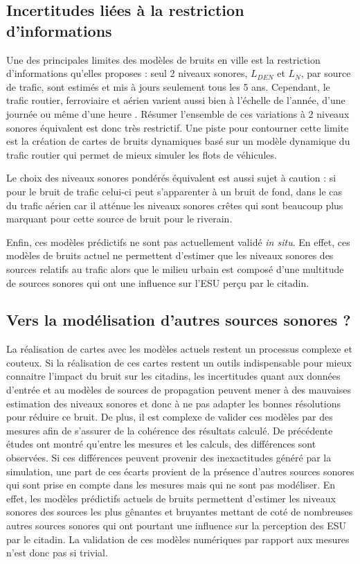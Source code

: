 \subsection{Incertitudes liées à la restriction d'informations}

Une des principales limites des modèles de bruits en ville est la restriction d'informations qu'elles proposes : seul 2 niveaux sonores, $L_{DEN}$ et $L_N$, par source de trafic, sont estimés et mis à jours seulement tous les 5 ans. Cependant, le trafic routier, ferroviaire et aérien varient aussi bien à l'échelle de l'année, d'une journée ou même d'une heure \cite{lv2015traffic}. Résumer l'ensemble de ces variations à 2 niveaux sonores équivalent est donc très restrictif. 
Une piste pour contourner cette limite est la création de cartes de bruits dynamiques basé sur un modèle dynamique du trafic routier qui permet de mieux simuler les flots de véhicules. 

Le choix des niveaux sonores pondérés équivalent est aussi sujet à caution : si pour le bruit de trafic celui-ci peut s'apparenter à un bruit de fond, dans le cas du trafic aérien  car il atténue les niveaux sonores crêtes qui sont beaucoup plus marquant pour cette source de bruit pour le riverain.

Enfin, ces modèles prédictifs ne sont pas actuellement validé \textit{in situ}. 
En effet, ces modèles de bruits actuel ne permettent d'estimer que les niveaux sonores des sources relatifs au trafic alors que le milieu urbain est composé d'une multitude de sources sonores qui ont une influence sur l'ESU perçu par le citadin.\\ 
\subsection{Vers la modélisation d'autres sources sonores ?}

La réalisation de cartes avec les modèles actuels restent un processus complexe et couteux. Si la réalisation de ces cartes restent un outils indispensable pour mieux connaitre l'impact du bruit sur les citadins, les incertitudes quant aux données d'entrée et au modèles de sources de propagation peuvent mener à des mauvaises estimation des niveaux sonores et donc à ne pas adapter les bonnes résolutions pour réduire ce bruit. 
De plus, il est complexe de valider ces modèles par des mesures afin de s'assurer de la cohérence des résultats calculé. De précédente études \cite{Mioduszewski, zannin_characterization_2013} ont montré qu'entre les mesures et les calculs, des différences sont observées. Si ces différences peuvent provenir des inexactitudes généré par la simulation, une part de ces écarts provient de la présence d'autres sources sonores qui sont prise en compte dans les mesures mais qui ne sont pas modéliser. En effet, les modèles prédictifs actuels de bruits permettent d'estimer les niveaux sonores des sources les plus gênantes et bruyantes mettant de coté de nombreuses autres sources sonores qui ont pourtant une influence sur la perception des ESU par le citadin. La validation de ces modèles numériques par rapport aux mesures n'est donc pas si trivial. 

